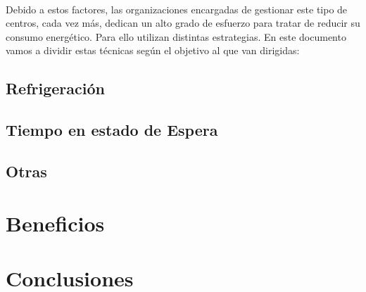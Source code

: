 \documentclass[10pt]{article}
\begin{document}
		\paragraph{}
		Debido a estos factores, las organizaciones encargadas de gestionar este tipo de centros, cada vez más, dedican un alto grado de esfuerzo para tratar de reducir su consumo energético. Para ello utilizan distintas estrategias. En este documento vamos a dividir estas técnicas según el objetivo al que van dirigidas:


		\subsection{Refrigeración}

			\paragraph{}


		\subsection{Tiempo en estado de Espera}

			\paragraph{}


		\subsection{Otras}

			\paragraph{}


    \section{Beneficios}
	\label{sec:beneficios}

    	\paragraph{}

    \section{Conclusiones}
	\label{sec:conclusiones}
\end{document}
